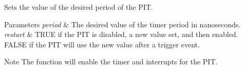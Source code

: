 Sets the value of the desired period of the P\+I\+T. 


\begin{DoxyParams}{Parameters}
{\em period} & The desired value of the timer period in nanoseconds. \\
\hline
{\em restart} & T\+R\+U\+E if the P\+I\+T is disabled, a new value set, and then enabled. F\+A\+L\+S\+E if the P\+I\+T will use the new value after a trigger event. \\
\hline
\end{DoxyParams}
\begin{DoxyNote}{Note}
The function will enable the timer and interrupts for the P\+I\+T. 
\end{DoxyNote}
